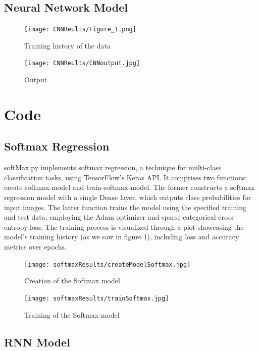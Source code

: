 \documentclass{article}
\begin{document}

\subsection{Neural Network Model}

\begin{figure}[h]
\caption{Training history of the data}
\centering
\texttt{[image: CNNReults/Figure\_1.png]}
\end{figure}

\begin{figure}[h]
\caption{Output}
\centering
\texttt{[image: CNNReults/CNNoutput.jpg]}
\end{figure}

\newpage
\section{Code}
\subsection{Softmax Regression}
softMax.py implements softmax regression, a technique for multi-class classification tasks, using TensorFlow's Keras API. It comprises two functions: create-softmax-model and train-softmax-model. The former constructs a softmax regression model with a single Dense layer, which outputs class probabilities for input images. The latter function trains the model using the specified training and test data, employing the Adam optimizer and sparse categorical cross-entropy loss. The training process is visualized through a plot showcasing the model's training history (as we saw in figure 1), including loss and accuracy metrics over epochs.

\begin{figure}[h]
\caption{Creation of the Softmax model}
\centering
\texttt{[image: softmaxResults/createModelSoftmax.jpg]}
\end{figure}

\begin{figure}[h]
\caption{Training of the Softmax model}
\centering
\texttt{[image: softmaxResults/trainSoftmax.jpg]}
\end{figure}

\newpage
\subsection{RNN Model}
\end{document}
